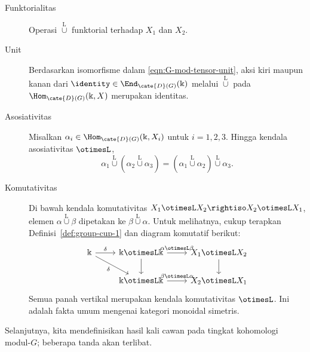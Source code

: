 \begin{description}
	\item[Funktorialitas] Operasi $\overset{\mathrm{L}}{\cup}$ funktorial
	terhadap $X_1$ dan $X_2$.
	\item[Unit] Berdasarkan isomorfisme dalam
	\eqref{eqn:G-mod-tensor-unit}, aksi kiri maupun kanan dari
	$\identity\in\End_{\cate{D}(G)}(\Bbbk)$ melalui
	$\overset{\mathrm{L}}{\cup}$ pada $\Hom_{\cate{D}(G)}(\Bbbk,X)$ merupakan
	identitas.
	\item[Asosiativitas] Misalkan
	$\alpha_i\in\Hom_{\cate{D}(G)}(\Bbbk,X_i)$ untuk $i=1,2,3$. Hingga kendala
	asosiativitas $\otimesL$,
	\[ \alpha_1 \overset{\mathrm{L}}{\cup} (\alpha_2 \overset{\mathrm{L}}{\cup} \alpha_3) = (\alpha_1 \overset{\mathrm{L}}{\cup} \alpha_2) \overset{\mathrm{L}}{\cup} \alpha_3 . \]
	\item[Komutativitas] Di bawah kendala komutativitas
	$X_1\otimesL X_2\rightiso X_2\otimesL X_1$, elemen
	$\alpha\overset{\mathrm{L}}{\cup}\beta$ dipetakan ke
	$\beta\overset{\mathrm{L}}{\cup}\alpha$. Untuk melihatnya, cukup terapkan
	Definisi~\ref{def:group-cup-1} dan diagram komutatif berikut:
	\[\begin{tikzcd}
		\Bbbk \arrow[r, "\delta"] \arrow[rd, "\delta"'] & \Bbbk \otimesL \Bbbk \arrow[d] \arrow[r, "{\alpha \otimesL \beta}"] & X_1 \otimesL X_2 \arrow[d] \\
		& \Bbbk \otimesL \Bbbk \arrow[r, "{\beta \otimesL \alpha}"] & X_2 \otimesL X_1
	\end{tikzcd}\]
	Semua panah vertikal merupakan kendala komutativitas $\otimesL$. Ini adalah
	fakta umum mengenai kategori monoidal simetris.
\end{description}

Selanjutnya, kita mendefinisikan hasil kali cawan pada tingkat kohomologi
modul-$G$; beberapa tanda akan terlibat.

